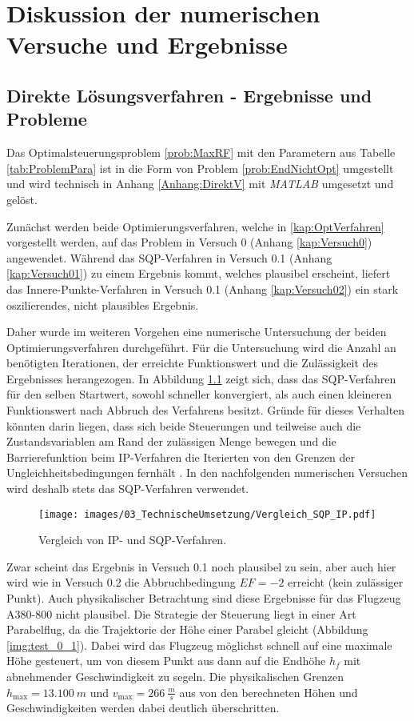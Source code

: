 \chapter{Diskussion der numerischen Versuche und Ergebnisse}\label{kap:LSG}

\section{Direkte Lösungsverfahren - Ergebnisse und Probleme}
Das Optimalsteuerungsproblem \ref{prob:MaxRF} mit den Parametern aus Tabelle \ref{tab:ProblemPara} ist in die Form von Problem \ref{prob:EndNichtOpt} umgestellt und wird technisch in Anhang \ref{Anhang:DirektV} mit \textit{MATLAB} umgesetzt und gelöst.

Zunächst werden beide Optimierungsverfahren, welche in \ref{kap:OptVerfahren} vorgestellt werden, auf das Problem in Versuch 0 (Anhang \ref{kap:Versuch0}) angewendet. Während das SQP-Verfahren in Versuch 0.1 (Anhang \ref{kap:Versuch01}) zu einem Ergebnis kommt, welches plausibel erscheint, liefert das Innere-Punkte-Verfahren in Versuch 0.1 (Anhang \ref{kap:Versuch02}) ein stark oszilierendes, nicht plausibles Ergebnis.

Daher wurde im weiteren Vorgehen eine numerische Untersuchung der beiden Optimierungsverfahren durchgeführt. Für die Untersuchung wird die Anzahl an benötigten Iterationen, der erreichte Funktionswert und die Zulässigkeit des Ergebnisses herangezogen. In Abbildung \ref{img:Vergleich_SQP_IP} zeigt sich, dass das SQP-Verfahren für den selben Startwert, sowohl schneller konvergiert, als auch einen kleineren Funktionswert nach Abbruch des Verfahrens besitzt. Gründe für dieses Verhalten könnten darin liegen, dass sich beide Steuerungen und teilweise auch die Zustandsvariablen am Rand der zulässigen Menge bewegen und die Barrierefunktion beim IP-Verfahren die Iterierten von den Grenzen der Ungleichheitsbedingungen fernhält \cite{Matlab2016}. In den nachfolgenden numerischen Versuchen wird deshalb stets das SQP-Verfahren verwendet.

\begin{figure}[htbp]
    \begin{center}
        \texttt{[image: images/03\_TechnischeUmsetzung/Vergleich\_SQP\_IP.pdf]}
        \caption{Vergleich von IP- und SQP-Verfahren.}\label{img:Vergleich_SQP_IP}
    \end{center}
\end{figure}

Zwar scheint das Ergebnis in Versuch 0.1 noch plausibel zu sein, aber auch hier wird wie in Versuch 0.2 die Abbruchbedingung $EF = -2$ erreicht (kein zulässiger Punkt). Auch physikalischer Betrachtung sind diese Ergebnisse für das Flugzeug A380-800 nicht plausibel. Die Strategie der Steuerung liegt in einer Art Parabelflug, da die Trajektorie der Höhe einer Parabel gleicht (Abbildung \ref{img:test_0_1}). Dabei wird das Flugzeug möglichst schnell auf eine maximale Höhe gesteuert, um von diesem Punkt aus dann auf die Endhöhe $h_f$ mit abnehmender Geschwindigkeit zu segeln. Die physikalischen Grenzen $h_{\max} = 13.100 \ m$ und $v_{\max} = 266 \ \frac{m}{s}$ aus \cite{A380Tech} von den berechneten Höhen und Geschwindigkeiten werden dabei deutlich überschritten.

